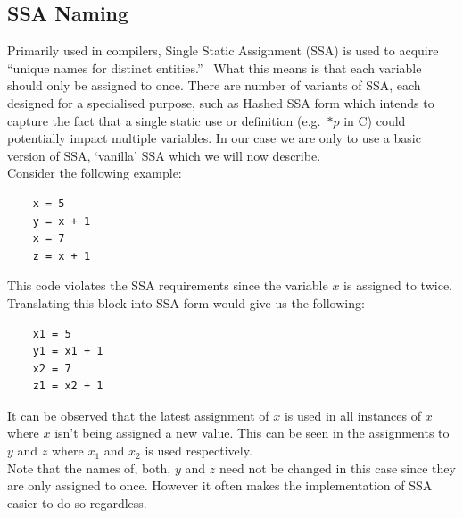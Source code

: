 \documentclass[12pt, titlepage]{article}
\begin{document}
\subsection{SSA Naming}
Primarily used in compilers, Single Static Assignment (SSA) is used to acquire ``unique names for distinct entities.''~\cite{ssaBook} What this means is that each variable should only be assigned to once. There are number of variants of SSA, each designed for a specialised purpose, such as Hashed SSA form which intends to capture the fact that a single static use or definition (e.g.\ $*p$ in C) could potentially impact multiple variables. In our case we are only to use a basic version of SSA, `vanilla' SSA which we will now describe. \\
Consider the following example:
\begin{lstlisting}
	x = 5
	y = x + 1
	x = 7
	z = x + 1
\end{lstlisting}
This code violates the SSA requirements since the variable $x$ is assigned to twice. Translating this block into SSA form would give us the following:
\begin{lstlisting}
	x1 = 5
	y1 = x1 + 1
	x2 = 7
	z1 = x2 + 1
\end{lstlisting}
It can be observed that the latest assignment of $x$  is used in all instances of $x$ where $x$ isn't being assigned a new value. This can be seen in the assignments to $y$ and $z$ where $x_1$ and $x_2$ is used respectively. \\
Note that the names of, both, $y$ and $z$ need not be changed in this case since they are only assigned to once. However it often makes the implementation of SSA easier to do so regardless.
\end{document}
